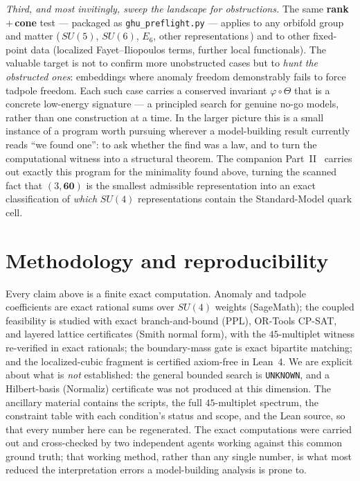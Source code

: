 \documentclass[11pt,a4paper]{article}
\begin{document}
\emph{Third, and most invitingly, sweep the landscape for obstructions.} The same
\textbf{rank\,$+$\,cone} test --- packaged as \texttt{ghu\_preflight.py} --- applies to any
orbifold group and matter (\,$SU(5)$, $SU(6)$, $E_6$, other representations\,) and to other
fixed-point data (localized Fayet--Iliopoulos terms, further local functionals). The
valuable target is not to confirm more unobstructed cases but to \emph{hunt the obstructed
ones}: embeddings where anomaly freedom demonstrably fails to force tadpole freedom. Each
such case carries a conserved invariant $\varphi\circ\Theta$ that is a concrete low-energy
signature --- a principled search for genuine no-go models, rather than one construction at a
time. In the larger picture this is a small instance of a program worth pursuing wherever a
model-building result currently reads ``we found one'': to ask whether the find was a law,
and to turn the computational witness into a structural theorem. The companion
Part~II~\cite{PartII} carries out exactly this program for the minimality found above,
turning the scanned fact that $(3,\mathbf{60})$ is the smallest admissible representation
into an exact classification of \emph{which} $SU(4)$ representations contain the
Standard-Model quark cell.

\section{Methodology and reproducibility}\label{sec:method}
Every claim above is a finite exact computation. Anomaly and tadpole coefficients are
exact rational sums over $SU(4)$ weights (SageMath); the coupled feasibility is studied
with exact branch-and-bound (PPL), OR-Tools CP-SAT, and layered lattice certificates
(Smith normal form), with the $45$-multiplet witness re-verified in exact rationals; the
boundary-mass gate is exact bipartite matching; and the localized-cubic fragment is
certified axiom-free in Lean~4. We are explicit about what is \emph{not} established: the
general bounded search is \texttt{UNKNOWN}, and a Hilbert-basis (Normaliz) certificate
was not produced at this dimension. The ancillary material contains the scripts, the
full $45$-multiplet spectrum, the constraint table with each condition's status and
scope, and the Lean source, so that every number here can be regenerated. The exact
computations were carried out and cross-checked by two independent agents working
against this common ground truth; that working method, rather than any single number,
is what most reduced the interpretation errors a model-building analysis is prone to.
\end{document}

